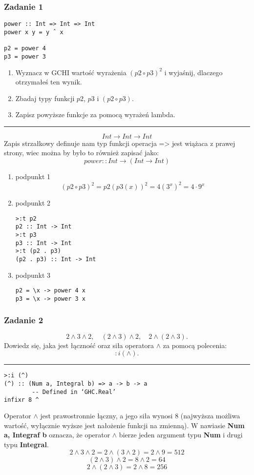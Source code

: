 \documentclass[11pt,a4paper]{article}
\begin{document}
\subsubsection{Zadanie 1}
\begin{Verbatim}[frame=single]
power :: Int => Int => Int
power x y = y ˆ x

p2 = power 4
p3 = power 3
\end{Verbatim}
\begin{enumerate}
    \item Wyznacz w GCHI wartość wyrażenia \( (p2 \circ p3)^2 \) i wyjaśnij, dlaczego otrzymałeś ten wynik.
    \item Zbadaj typy funkcji \( p2 \), \( p3 \) i \( (p2 \circ p3) \).
    \item Zapisz powyższe funkcje za pomocą wyrażeń lambda.
\end{enumerate}
\bigskip
\hrule
\bigskip
\[
    Int \rightarrow Int \rightarrow Int
\]
Zapis strzałkowy definuje nam typ funkcji operacja => jest wiążaca z prawej strony, wiec można by było to również zapisać jako:
\[
    power::Int \rightarrow (Int \rightarrow Int)
\]
\begin{enumerate}
    \item podpunkt 1
\[
    (p2 \circ p3)^2 = p2(p3(x))^2 = 4(3^x)^2 = 4 \cdot 9^x
\]
\item podpunkt 2
    \begin{Verbatim}[frame=single]
>:t p2
p2 :: Int -> Int
>:t p3
p3 :: Int -> Int
>:t (p2 . p3)
(p2 . p3) :: Int -> Int
    \end{Verbatim}
\item podpunkt 3
    \begin{Verbatim}[frame=single]
p2 = \x -> power 4 x
p3 = \x -> power 3 x
    \end{Verbatim}
\end{enumerate}
\subsubsection{Zadanie 2}
\[
2 \wedge 3 \wedge 2, \quad (2 \wedge 3) \wedge 2, \quad 2 \wedge (2 \wedge 3).
\]
Dowiedz się, jaka jest łączność oraz siła operatora \(\wedge\) za pomocą polecenia:
\[
:i (\wedge).
\]
\bigskip
\hrule
\bigskip
\begin{Verbatim}[frame=single]
>:i (^)
(^) :: (Num a, Integral b) => a -> b -> a
        -- Defined in ‘GHC.Real’
infixr 8 ^
\end{Verbatim}
Operator \(\wedge\) jest prawostronnie łączny, a jego siła wynosi 8 (najwyższa możliwa wartość, wyłącznie wyższe jest nałożenie funkcji na zmienną). W nawiasie \textbf{Num a, Integraf b} oznacza, że operator \(\wedge\) bierze jeden argument typu \textbf{Num} i drugi typu \textbf{Integral}.
\[
    2 \wedge 3 \wedge 2 = 2 \wedge (3 \wedge 2) = 2 \wedge 9 = 512
\]
\[
    (2 \wedge 3) \wedge 2 = 8 \wedge 2 = 64
\]
\[
    2 \wedge (2 \wedge 3) = 2 \wedge 8 = 256
\]
\end{document}
